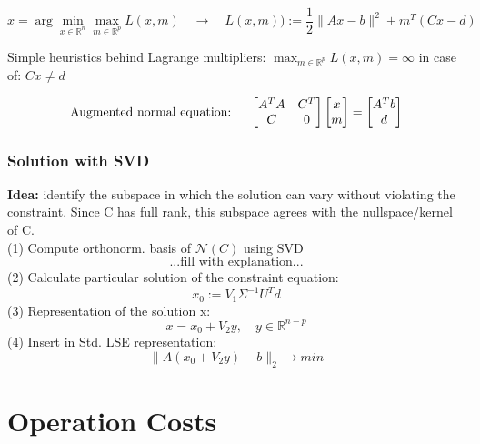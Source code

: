 \documentclass[12pt, a4paper]{article}
\newcommand{\R}{\mathbb{R}}
\newcommand{\argmin}{\arg\!\min}
\begin{document}
\begin{equation*}
	x = \argmin_{x \in \R^{n}}  \max_{m \in \R^{p}} L(x,m)  \quad \longrightarrow \quad L(x,m) ) := \frac{1}{2} \lVert Ax - b\rVert^{2} + m^{T} (Cx - d)
\end{equation*}

Simple heuristics behind Lagrange multipliers: $\max_{m \in \R^{p}} L(x,m) = \infty $ in case of: $Cx \not = d$

\begin{equation*}
	\text{Augmented normal equation: \quad}
  	\begin{bmatrix}
  		A^{T}A 	& C^{T} \\
  		C 			& 0 
  	\end{bmatrix}
  	\begin{bmatrix}
  		x \\
  		m
  	\end{bmatrix} 
  	=
  	\begin{bmatrix}
  		A^{T}b \\
  		d
  	\end{bmatrix} 
\end{equation*}

\subsubsection{Solution with SVD}
\textbf{Idea:} identify the subspace in which the solution can vary without violating the constraint. Since C has full
rank, this subspace agrees with the nullspace/kernel of C.
\vspace{3mm} \\
(1) Compute orthonorm. basis of $\mathcal{N}(C)$ using SVD \\
\[ ... \text{fill with explanation} ... \]
(2) Calculate particular solution of the constraint equation: \\
\[ x_0 := V_1\Sigma^{-1}U^{T}d \] 
(3) Representation of the solution x: \\
\[ x =x_0 + V_2y, \quad  y \in \R^{n-p}\]
(4) Insert in Std. LSE representation:  \\
\[ \lVert A(x_0 + V_2y) - b\rVert_{2} \rightarrow min \]

\newpage
\section{Operation Costs}
\end{document}
